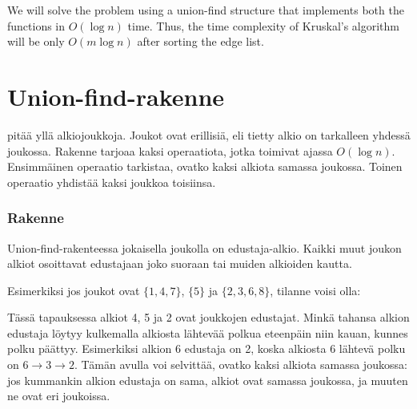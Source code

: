 We will solve the problem using a union-find structure
that implements both the functions in $O(\log n)$ time.
Thus, the time complexity of Kruskal's algorithm
will be only $O(m \log n)$ after sorting the edge list.

\section{Union-find-rakenne}


 pitää yllä
alkiojoukkoja.
Joukot ovat erillisiä,
eli tietty alkio on tarkalleen
yhdessä joukossa.
Rakenne tarjoaa kaksi operaatiota,
jotka toimivat ajassa $O(\log n)$.
Ensimmäinen operaatio tarkistaa,
ovatko kaksi alkiota samassa joukossa.
Toinen operaatio yhdistää kaksi
joukkoa toisiinsa.

\subsubsection{Rakenne}

Union-find-rakenteessa jokaisella
joukolla on edustaja-alkio.
Kaikki muut joukon alkiot osoittavat
edustajaan joko suoraan tai
muiden alkioiden kautta.

Esimerkiksi jos joukot ovat
$\{1,4,7\}$, $\{5\}$ ja $\{2,3,6,8\}$,
tilanne voisi olla:
\begin{center}
\end{center}
Tässä tapauksessa alkiot 4, 5 ja 2
ovat joukkojen edustajat.
Minkä tahansa alkion edustaja
löytyy kulkemalla alkiosta lähtevää polkua
eteenpäin niin kauan, kunnes polku päättyy.
Esimerkiksi alkion 6 edustaja on 2,
koska alkiosta 6 lähtevä
polku on $6 \rightarrow 3 \rightarrow 2$.
Tämän avulla voi selvittää,
ovatko kaksi alkiota samassa joukossa:
jos kummankin alkion edustaja on sama,
alkiot ovat samassa joukossa,
ja muuten ne ovat eri joukoissa.

